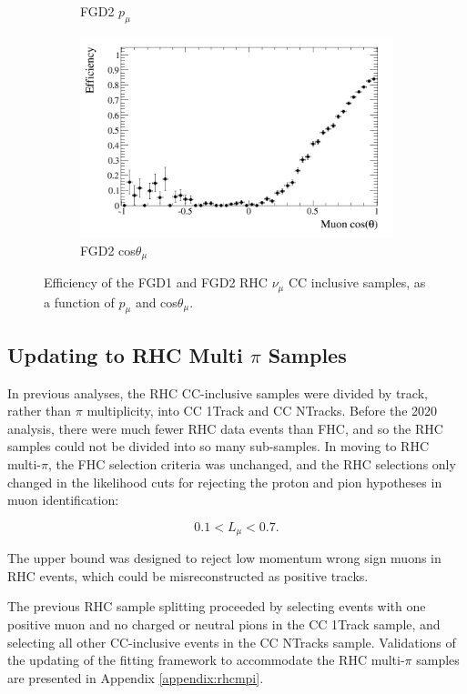 \begin{figure}
\begin{subfigure}{.48\textwidth}
  \caption{FGD2 $p_{\mu}$}
\end{subfigure}
\begin{subfigure}{.48\textwidth}
  \centering
  \includegraphics[width=0.95\linewidth]{figs/effcosfgd2nuinnubar}
  \caption{FGD2 cos$\theta_{\mu}$}
\end{subfigure}
\caption{Efficiency of the FGD1 and FGD2 RHC $\nu_{\mu}$ CC inclusive samples, as a function of $p_{\mu}$ and cos$\theta_{\mu}$.}
\label{fig:nuinnubareff}
\end{figure}

\subsection{Updating to RHC Multi $\pi$ Samples}

In previous analyses, the RHC CC-inclusive samples were divided by track, rather than $\pi$ multiplicity, into CC 1Track and CC NTracks. Before the 2020 analysis, there were much fewer RHC data events than FHC, and so the RHC samples could not be divided into so many sub-samples. In moving to RHC multi-$\pi$, the FHC selection criteria was unchanged, and the RHC selections only changed in the likelihood cuts for rejecting the proton and pion hypotheses in muon identification:

\begin{equation}
0.1 < L_{\mu} < 0.7.
\end{equation}

The upper bound was designed to reject low momentum wrong sign muons in RHC events, which could be misreconstructed as positive tracks.

The previous RHC sample splitting proceeded by selecting events with one positive muon and no charged or neutral pions in the CC 1Track sample, and selecting all other CC-inclusive events in the CC NTracks sample. Validations of the updating of the fitting framework to accommodate the RHC multi-$\pi$ samples are presented in Appendix \ref{appendix:rhcmpi}.

